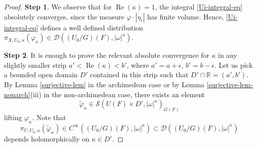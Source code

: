 \documentclass[12pt,reqno]{amsart}
\theoremstyle{definition}
\theoremstyle{remark}
\numberwithin{equation}{section}
\newcommand{\wt}{\widetilde}
\newcommand{\ot}{\otimes}
\newcommand{\DD}{{\mathcal D}}
\renewcommand{\SS}{{\mathcal S}}
\newcommand{\sub}{\subset}
\newcommand{\om}{\omega}
\newcommand{\fg}{{\mathfrak g}}
\newcommand{\vol}{{\operatorname{vol}}}
\newcommand{\eps}{\epsilon}
\newcommand{\R}{{\mathbb R}}
\begin{document}
\begin{proof}
\medskip

\noindent
{\bf Step 1}. We observe that for $\operatorname{Re}(\kappa)=1$, 
the integral \eqref{Ui-integral-eq} absolutely converges, since the measure $\varphi\cdot |\eta_i|$ has finite volume. 
Hence, \eqref{Ui-integral-eq} defines a well defined distribution $\pi_{X,U_0,\kappa}(\varphi_{\kappa})\in
 \DD((U_0/G)(F),|\om|^{\kappa})$.


\medskip

\noindent
{\bf Step 2}. It is enough to prove the relevant absolute convergence for $\kappa$ in any slightly smaller strip $a'<\operatorname{Re}(\kappa)<b'$,
where $a'=a+\eps$, $b'=b-\eps$. Let us pick a bounded open domain $D'$ contained in this strip such that $D'\cap \R=(a',b')$.
By Lemma \ref{surjective-lem} in the archimedean case or by Lemma \ref{surjective-lem-nonarch}(iii) in the non-archimedean case,
there exists an element
$$\wt{\varphi}_{\kappa}\in \SS(U(F)\times D',|\om|^{\kappa})_{G(F)}$$ 
lifting $\varphi_\kappa$.
Note that
$$\pi_{U,U_0,\kappa}(\wt{\varphi}_{\kappa})\in C^\infty((U_0/G)(F),|\om|^{\kappa})\sub  \DD((U_0/G)(F),|\om|^{\kappa})$$ 
depends holomorphically on $\kappa\in D'$.


\end{proof}
\end{document}
